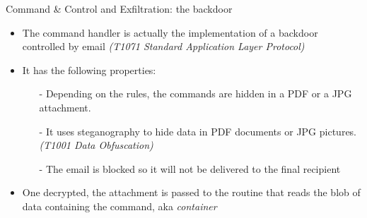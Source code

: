 \begin{frame}[fragile]{Command \& Control and Exfiltration: the backdoor}
    \begin{itemize}
        \item The command handler is actually the implementation of a backdoor controlled by email 
        \emph{(T1071 Standard Application Layer Protocol)}
        \item It has the following properties:
        \begin{itemize}
            \item[-] Depending on the rules, the commands are hidden in a PDF or a JPG attachment. 
            \item[-] It uses steganography to hide data in PDF documents or JPG pictures. \emph{(T1001 Data Obfuscation)}
            \item[-] The email is blocked so it will not be delivered to the final recipient 
        \end{itemize}
        \item One decrypted, the attachment is passed to the routine that reads the blob of data containing the command, aka \emph{container}
    \end{itemize}
\end{frame}

